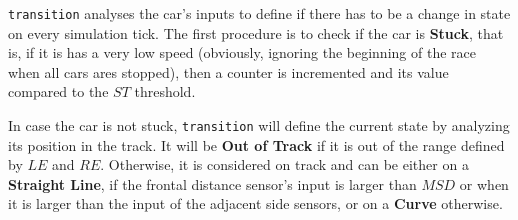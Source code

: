 \texttt{transition} analyses the car's inputs to define if there has to be a
change in state on every simulation tick. The first procedure is to check if the
car is \textbf{Stuck}, that is, if it is has a very low speed (obviously, ignoring 
the beginning of the race when all cars ares stopped), then a counter is incremented 
and its value compared to the $ST$ threshold.

In case the car is not stuck, \texttt{transition} will define the current state
by analyzing its position in the track. It will be \textbf{Out of Track} if it is
out of the range defined by $LE$ and $RE$. Otherwise, it is considered 
on track and can be either on a \textbf{Straight Line}, if the frontal distance 
sensor's input is larger than $MSD$ or when it is larger than the input of the 
adjacent side sensors, or on a \textbf{Curve} otherwise. 